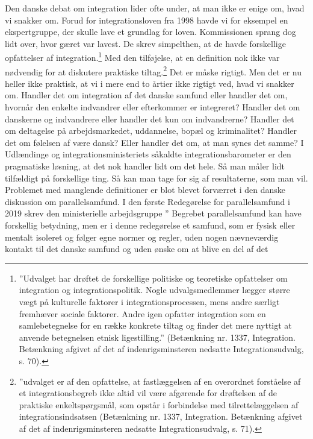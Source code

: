 \documentclass[
]{book}
\begin{document}
Den danske debat om integration lider ofte under, at man ikke er enige om, hvad vi snakker om. Forud for integrationsloven fra 1998 havde vi for eksempel en ekspertgruppe, der skulle lave et grundlag for loven. Kommissionen sprang dog lidt over, hvor gæret var lavest. De skrev simpelthen, at de havde forskellige opfattelser af integration.\footnote{''Udvalget har drøftet de forskellige politiske og teoretiske opfattelser om integration og integrationspolitik. Nogle udvalgsmedlemmer lægger større vægt på kulturelle faktorer i integrationsprocessen, mens andre særligt fremhæver sociale faktorer. Andre igen opfatter integration som en samlebetegnelse for en række konkrete tiltag og finder det mere nyttigt at anvende betegnelsen etnisk ligestilling.'' (Betænkning nr. 1337, Integration. Betænkning afgivet af det af indenrigsminsteren nedsatte Integrationsudvalg, s. 70).} Med den tilføjelse, at en definition nok ikke var nødvendig for at diskutere praktiske tiltag.\footnote{''udvalget er af den opfattelse, at fastlæggelsen af en overordnet forståelse af et integrationsbegreb ikke altid vil være afgørende for drøftelsen af de praktiske enkeltspørgsmål, som opstår i forbindelse med tilrettelæggelsen af integrationsindsatsen (Betænkning nr. 1337, Integration. Betænkning afgivet af det af indenrigsminsteren nedsatte Integrationsudvalg, s. 71).} Det er måske rigtigt. Men det er nu heller ikke praktisk, at vi i mere end to årtier ikke rigtigt ved, hvad vi snakker om. Handler det om integration af det danske samfund eller handler det om, hvornår den enkelte indvandrer eller efterkommer er integreret? Handler det om danskerne og indvandrere eller handler det kun om indvandrerne? Handler det om deltagelse på arbejdsmarkedet, uddannelse, bopæl og kriminalitet? Handler det om følelsen af være dansk? Eller handler det om, at man synes det samme? I Udlændinge og integrationsministeriets såkaldte integrationsbarometer er den pragmatiske løsning, at det nok handler lidt om det hele. Så man måler lidt tilfældigt på forskellige ting. Så kan man tage for sig af resultaterne, som man vil. Problemet med manglende definitioner er blot blevet forværret i den danske diskussion om parallelsamfund. I den første Redegørelse for parallelsamfund i 2019 skrev den ministerielle arbejdsgruppe '' Begrebet parallelsamfund kan have forskellig betydning, men er i denne redegørelse et samfund, som er fysisk eller mentalt isoleret og følger egne normer og regler, uden nogen nævneværdig kontakt til det danske samfund og uden ønske om at blive en del af det
\end{document}
